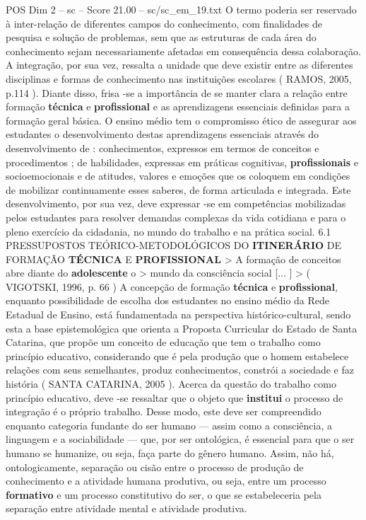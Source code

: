 \begin{textsample}{POS Dim 2 – sc – Score 21.00 – sc/sc\_em\_19.txt}
O termo poderia ser reservado à inter-relação de diferentes campos do conhecimento, com finalidades de pesquisa e solução de problemas, sem que as estruturas de cada área do conhecimento sejam necessariamente afetadas em consequência dessa colaboração.
A integração, por sua vez, ressalta a unidade que deve existir entre as diferentes disciplinas e formas de conhecimento nas instituições escolares ( RAMOS, 2005, p.114 ).
Diante disso, frisa -se a importância de se manter clara a relação entre formação \textbf{técnica} e \textbf{profissional} e as aprendizagens essenciais definidas para a formação geral básica.
O ensino médio tem o compromisso ético de assegurar aos estudantes o desenvolvimento destas aprendizagens essenciais através do desenvolvimento de : conhecimentos, expressos em termos de conceitos e procedimentos ; de habilidades, expressas em práticas cognitivas, \textbf{profissionais} e socioemocionais e de atitudes, valores e emoções que os coloquem em condições de mobilizar continuamente esses saberes, de forma articulada e integrada.
Este desenvolvimento, por sua vez, deve expressar -se em competências mobilizadas pelos estudantes para resolver demandas complexas da vida cotidiana e para o pleno exercício da cidadania, no mundo do trabalho e na prática social. 6.1 PRESSUPOSTOS TEÓRICO-METODOLÓGICOS DO \textbf{ITINERÁRIO} DE FORMAÇÃO \textbf{TÉCNICA} E \textbf{PROFISSIONAL} > A formação de conceitos abre diante do \textbf{adolescente} o > mundo da consciência social [... ] > ( VIGOTSKI, 1996, p. 66 ) A concepção de formação \textbf{técnica} e \textbf{profissional}, enquanto possibilidade de escolha dos estudantes no ensino médio da Rede Estadual de Ensino, está fundamentada na perspectiva histórico-cultural, sendo esta a base epistemológica que orienta a Proposta Curricular do Estado de Santa Catarina, que propõe um conceito de educação que tem o trabalho como princípio educativo, considerando que é pela produção que o homem estabelece relações com seus semelhantes, produz conhecimentos, constrói a sociedade e faz história ( SANTA CATARINA, 2005 ).
Acerca da questão do trabalho como princípio educativo, deve -se ressaltar que o objeto que \textbf{institui} o processo de integração é o próprio trabalho.
Desse modo, este deve ser compreendido enquanto categoria fundante do ser humano — assim como a consciência, a linguagem e a sociabilidade — que, por ser ontológica, é essencial para que o ser humano se humanize, ou seja, faça parte do gênero humano.
Assim, não há, ontologicamente, separação ou cisão entre o processo de produção de conhecimento e a atividade humana produtiva, ou seja, entre um processo \textbf{formativo} e um processo constitutivo do ser, o que se estabeleceria pela separação entre atividade mental e atividade produtiva.

\end{textsample}
